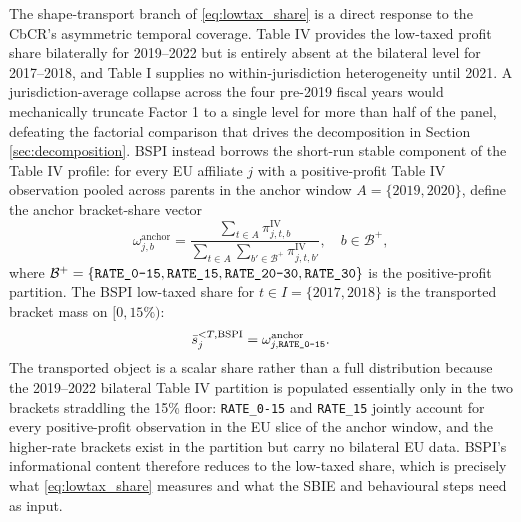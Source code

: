 \documentclass[11pt,a4paper]{article}
\newcommand{\code}[1]{\texttt{#1}}
\begin{document}
The shape-transport branch of \eqref{eq:lowtax_share} is a direct response to the CbCR's asymmetric temporal coverage. Table IV provides the low-taxed profit share bilaterally for 2019--2022 but is entirely absent at the bilateral level for 2017--2018, and Table I supplies no within-jurisdiction heterogeneity until 2021. A jurisdiction-average collapse across the four pre-2019 fiscal years would mechanically truncate Factor 1 to a single level for more than half of the panel, defeating the factorial comparison that drives the decomposition in Section \ref{sec:decomposition}. BSPI instead borrows the short-run stable component of the Table IV profile: for every EU affiliate $j$ with a positive-profit Table IV observation pooled across parents in the anchor window $A = \{2019, 2020\}$, define the anchor bracket-share vector
\begin{equation}\label{eq:bspi_anchor}
\omega_{j,b}^{\text{anchor}} = \frac{\sum_{t \in A}\pi_{j,t,b}^{\text{IV}}}{\sum_{t \in A}\sum_{b' \in \mathcal{B}^{+}}\pi_{j,t,b'}^{\text{IV}}}, \quad b \in \mathcal{B}^{+},
\end{equation}
where $\mathcal{B}^{+} = \{\code{RATE\_0\text{-}15},\code{RATE\_15},\code{RATE\_20\text{-}30},\code{RATE\_30}\}$ is the positive-profit partition. The BSPI low-taxed share for $t \in I = \{2017, 2018\}$ is the transported bracket mass on $[0, 15\%)$:
\begin{equation}\label{eq:bspi}
\bar{s}_{j}^{<T,\text{BSPI}} = \omega_{j,\code{RATE\_0\text{-}15}}^{\text{anchor}}.
\end{equation}
The transported object is a scalar share rather than a full distribution because the 2019--2022 bilateral Table IV partition is populated essentially only in the two brackets straddling the 15\% floor: \code{RATE\_0-15} and \code{RATE\_15} jointly account for every positive-profit observation in the EU slice of the anchor window, and the higher-rate brackets exist in the partition but carry no bilateral EU data. BSPI's informational content therefore reduces to the low-taxed share, which is precisely what \eqref{eq:lowtax_share} measures and what the SBIE and behavioural steps need as input.
\end{document}
